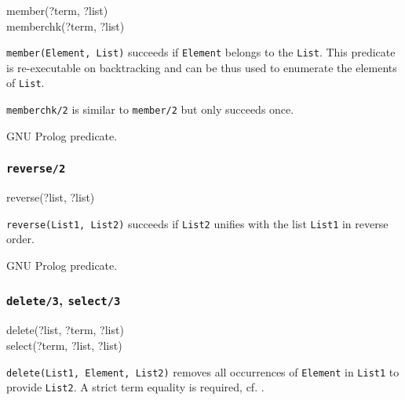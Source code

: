 \begin{TemplatesOneCol}
member(?term, ?list)\\
memberchk(?term, ?list)

\end{TemplatesOneCol}

\Description

\texttt{member(Element, List)} succeeds if \texttt{Element} belongs to the
\texttt{List}. This predicate is re-executable on backtracking and can be
thus used to enumerate the elements of \texttt{List}.

\texttt{memberchk/2} is similar to \texttt{member/2} but only succeeds once.

\PlErrorsNone

\Portability

GNU Prolog predicate.

\subsubsection{\texttt{reverse/2}}

\begin{TemplatesOneCol}
reverse(?list, ?list)

\end{TemplatesOneCol}

\Description

\texttt{reverse(List1, List2)} succeeds if \texttt{List2} unifies with the
list \texttt{List1} in reverse order.

\PlErrorsNone

\Portability

GNU Prolog predicate.

\subsubsection{\texttt{delete/3},
               \texttt{select/3}}

\begin{TemplatesOneCol}
delete(?list, ?term, ?list)\\
select(?term, ?list, ?list)

\end{TemplatesOneCol}

\Description

\texttt{delete(List1, Element, List2)} removes all occurrences of
\texttt{Element} in \texttt{List1} to provide \texttt{List2}. A strict term
equality is required, cf.  .

